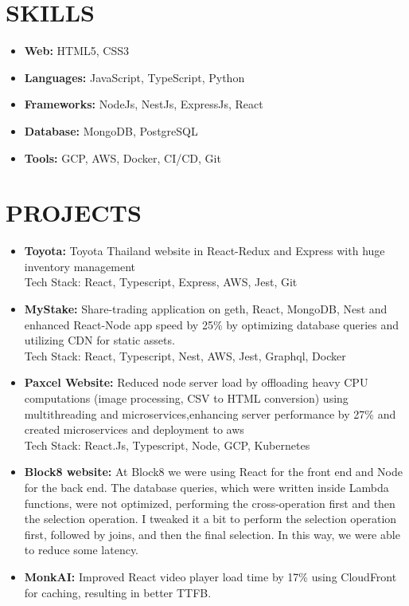\documentclass[line, margin, 12pt]{res}
\begin{document}
\begin{resume}
\section{SKILLS}
\begin{itemize}
\item \textbf{Web:} HTML5, CSS3
\item \textbf{Languages:} JavaScript, TypeScript, Python
\item \textbf{Frameworks:} NodeJs, NestJs, ExpressJs, React
\item \textbf{Database:} MongoDB, PostgreSQL
\item \textbf{Tools:} GCP, AWS, Docker, CI/CD, Git
\end{itemize}

\section{PROJECTS}
\begin{itemize}
\item \textbf{Toyota:} Toyota Thailand website in React-Redux and Express with huge inventory management \\
Tech Stack: React, Typescript, Express, AWS, Jest, Git \\

\item \textbf{MyStake:} Share-trading application on geth, React, MongoDB, Nest and
enhanced React-Node app speed by 25\% by optimizing database queries and utilizing CDN for static assets. \\
Tech Stack: React, Typescript, Nest, AWS, Jest, Graphql, Docker \\

\item \textbf{Paxcel Website:} Reduced node server load by offloading heavy CPU computations (image processing, CSV to HTML conversion) using multithreading and microservices,enhancing server performance by 27\% and created microservices and deployment to aws \\
Tech Stack: React.Js, Typescript, Node, GCP, Kubernetes \\

\item \textbf{Block8 website:} At Block8 we were using React for the front end and Node for the back end. The database queries, which were written inside Lambda functions, were not optimized, performing the cross-operation first and then the selection operation. I tweaked it a bit to perform the selection operation first, followed by joins, and then the final selection. In this way, we were able to reduce some latency.\\
\item \textbf{MonkAI:} Improved React video player load time by 17\% using CloudFront for caching, resulting in better TTFB.
\end{itemize}


\end{resume}
\end{document}
